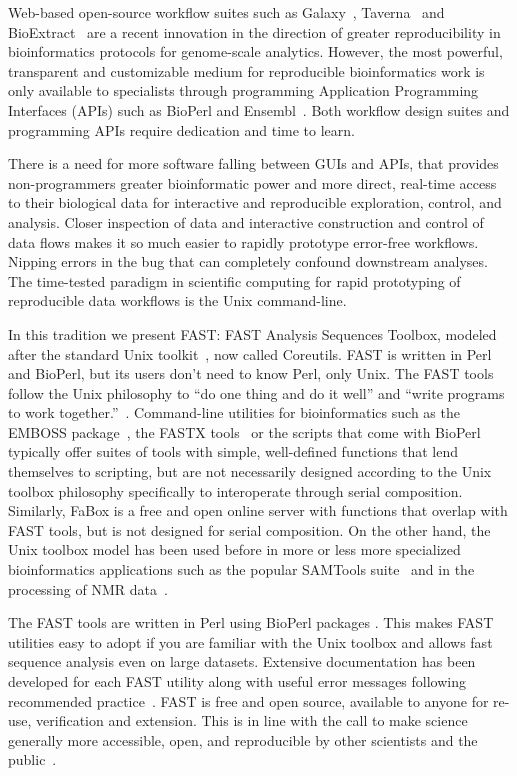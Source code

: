 \documentclass{frontiersSCNS} %
\begin{document}
Web-based open-source workflow suites such as Galaxy~\citep{galaxy14},
Taverna~\citep{CPE:CPE993} and BioExtract~\citep{Lushbough01072011}
are a recent innovation in the direction of greater reproducibility in
bioinformatics protocols for genome-scale analytics. However, the most
powerful, transparent and customizable medium for reproducible
bioinformatics work is only available to specialists through
programming Application Programming Interfaces (APIs) such as BioPerl
and Ensembl~\citep{Yates01012015}. Both workflow design suites and
programming APIs require dedication and time to learn.

There is a need for more software falling between GUIs and APIs, that
provides non-programmers greater bioinformatic power and more direct,
real-time access to their biological data for interactive and
reproducible exploration, control, and analysis. Closer inspection of
data and interactive construction and control of data flows makes it
so much easier to rapidly prototype error-free workflows. Nipping
errors in the bug  that can completely confound downstream analyses.  The
time-tested paradigm in scientific computing for rapid prototyping of
reproducible data workflows is the Unix command-line.

In this tradition we present FAST: FAST Analysis Sequences Toolbox,
modeled after the standard Unix toolkit~\citep{Peek2001}, now called
Coreutils. FAST is written in Perl and BioPerl, but its users don't
need to know Perl, only Unix. The FAST tools follow the Unix philosophy to ``do one thing
and do it well'' and ``write programs to work
together.''~\citep{Stutz2000}. Command-line utilities for
bioinformatics such as the EMBOSS package~\citep{Rice2000}, the FASTX
tools~\citep{fastx} or the scripts that come with
BioPerl~\citep{Stajich2002} typically offer suites of tools with
simple, well-defined functions that lend themselves to scripting, but
are not necessarily designed according to the Unix toolbox philosophy
specifically to interoperate through serial composition. Similarly,
FaBox is a free and open online server with functions that overlap
with FAST tools, but is not designed for serial composition. On the
other hand, the Unix toolbox model has been used before in more or
less more specialized bioinformatics applications such as the popular
SAMTools suite~\citep{Li15082009} and in the processing of NMR
data~\citep{delaglio1995nmrpipe}.

The FAST tools are written in Perl using BioPerl packages
\citep{Stajich2002}. This makes FAST utilities easy to adopt if you
are familiar with the Unix toolbox and allows fast sequence analysis
even on large datasets. Extensive documentation has been developed for
each FAST utility along with useful error messages following
recommended practice~\citep{Seemann2013}. FAST is free and open
source, available to anyone for re-use, verification and
extension. This is in line with the call to make science generally
more accessible, open, and reproducible by other scientists and the
public~\citep{Groves2012}.
\end{document}
